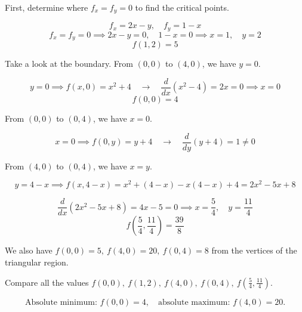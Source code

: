 \documentclass{article}
\begin{document}
First, determine where $f_x=f_y=0$ to find the critical points.

\[f_x=2x-y,\quad f_y=1-x\]
\[f_x=f_y=0\implies2x-y=0,\quad1-x=0\implies x=1,\quad y=2\]
\[f(1,2)=5\]

Take a look at the boundary. From $(0,0)$ to $(4,0)$, we have $y=0$.

\[y=0\implies f(x,0)=x^2+4\quad\rightarrow\quad\frac d{dx}\left(x^2-4\right)=2x=0\implies x=0\]
\[f(0,0)=4\]

From $(0,0)$ to $(0,4)$, we have $x=0$.

\[x=0\implies f(0,y)=y+4\quad\rightarrow\quad\frac d{dy}\left(y+4\right)=1\neq0\]

From $(4,0)$ to $(0,4)$, we have $x=y$.

\[y=4-x\implies f(x,4-x)=x^2+(4-x)-x(4-x)+4=2x^2-5x+8\]

\[\frac d{dx}\left(2x^2-5x+8\right)=4x-5=0\implies x=\frac54,\quad y=\frac{11}4\]
\[f\left(\frac54,\frac{11}4\right)=\frac{39}8\]

We also have $f(0,0)=5,\:f(4,0)=20,\:f(0,4)=8$ from the vertices of the triangular region.

Compare all the values $f(0,0),\:f(1,2),\:f(4,0),\:f(0,4),\:f\left(\frac54,\frac{11}4\right)$.

\[\boxed{\text{Absolute minimum: }f(0,0)=4,\quad \text{absolute maximum: } f(4,0)=20.}\]
\end{document}
